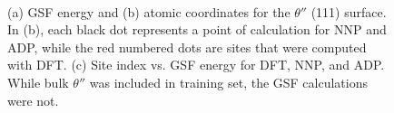 \documentclass{article}
\begin{document}
\begin{figure}[H]%
\centering%
%
%
\\
%
\caption{(a) GSF energy and (b) atomic coordinates for the $\theta''$ (111) surface. 
In (b), each black dot represents a point of calculation for NNP and ADP, while the red numbered dots are sites that were computed with DFT.
(c) Site index vs. GSF energy for DFT, NNP, and ADP.
While bulk $\theta''$ was included
in training set, the GSF calculations were not.}
\label{fig:GSF_ThetaDP_111}
\end{figure}
\end{document}
